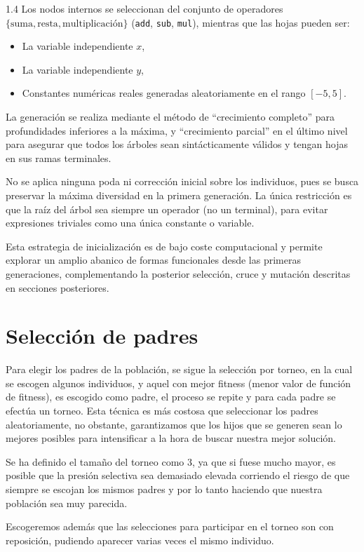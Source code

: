 \documentclass{article}
\begin{document}
\begin{spacing}{1.4}
Los nodos internos se seleccionan del conjunto de operadores $\{ \text{suma}, \text{resta}, \text{multiplicación} \}$ (\texttt{add}, \texttt{sub}, \texttt{mul}), mientras que las hojas pueden ser:
\begin{itemize}
    \item La variable independiente $x$,
    \item La variable independiente $y$,
    \item Constantes numéricas reales generadas aleatoriamente en el rango $[-5, 5]$.
\end{itemize}

La generación se realiza mediante el método de ``crecimiento completo'' para profundidades inferiores a la máxima, y ``crecimiento parcial'' en el último nivel para asegurar que todos los árboles sean sintácticamente válidos y tengan hojas en sus ramas terminales.

No se aplica ninguna poda ni corrección inicial sobre los individuos, pues se busca preservar la máxima diversidad en la primera generación. La única restricción es que la raíz del árbol sea siempre un operador (no un terminal), para evitar expresiones triviales como una única constante o variable.

Esta estrategia de inicialización es de bajo coste computacional y permite explorar un amplio abanico de formas funcionales desde las primeras generaciones, complementando la posterior selección, cruce y mutación descritas en secciones posteriores.

\section{Selección de padres}
Para elegir los padres de la población, se sigue la selección por torneo, en la cual se escogen
algunos individuos, y aquel con mejor fitness (menor valor de función de fitness),
es escogido como padre, el proceso se repite y para cada padre se efectúa un torneo. Esta técnica
es más costosa que seleccionar los padres aleatoriamente, no obstante, garantizamos que los hijos que se generen sean
lo mejores posibles para intensificar a la hora de buscar nuestra mejor solución.

Se ha definido el tamaño del torneo como 3, ya que si fuese mucho mayor, es posible que la presión selectiva sea demasiado elevada
corriendo el riesgo de que siempre se escojan los mismos padres y por lo tanto haciendo que nuestra población sea muy parecida.

Escogeremos además que las selecciones para participar en el torneo son con reposición, pudiendo aparecer varias veces el mismo individuo.


\end{spacing}
\end{document}
